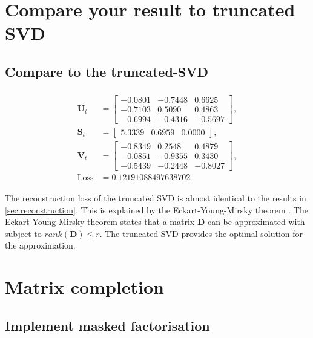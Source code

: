 \documentclass[10pt, twocolumn]{article}
\begin{document}
\section{Compare your result to truncated SVD}

\subsection{Compare to the truncated-SVD}

\begin{align*}
    \begin{split}
    \pmb{U}_t &=
    \begin{bmatrix}
        -0.0801 & -0.7448 &  0.6625\\
        -0.7103 &  0.5090 &  0.4863\\
        -0.6994 & -0.4316 & -0.5697
    \end{bmatrix},\\
    \pmb{S}_t &=
    \begin{bmatrix}
        5.3339 & 0.6959 & 0.0000
    \end{bmatrix},\\
    \pmb{V}_t &=
    \begin{bmatrix}
        -0.8349 &  0.2548 &  0.4879\\
        -0.0851 & -0.9355 &  0.3430\\
        -0.5439 & -0.2448 & -0.8027
    \end{bmatrix},\\
    \text{Loss} &= 0.12191088497638702
    \end{split}
\end{align*}

The reconstruction loss of the truncated SVD is almost identical to the results in \cref{sec:reconstruction}. This is explained by the Eckart-Young-Mirsky theorem \autocite{eckartApproximationOneMatrix1936}. The Eckart-Young-Mirsky theorem states that a matrix $\pmb{D}$ can be approximated with subject to $rank(\pmb{D}) \leq r$. The truncated SVD provides the optimal solution for the approximation.

\section{Matrix completion}

\subsection{Implement masked factorisation}
\end{document}
